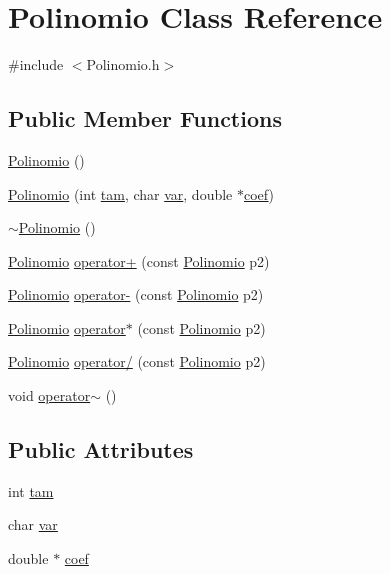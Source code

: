 \hypertarget{class_polinomio}{\section{Polinomio Class Reference}
\label{class_polinomio}
}


{\ttfamily \#include $<$Polinomio.\+h$>$}

\subsection*{Public Member Functions}
\begin{DoxyCompactItemize}
\item 
\hyperlink{class_polinomio_ac910fd7c555f384a2b12a8f498acd2f4}{Polinomio} ()
\item 
\hyperlink{class_polinomio_a7c1211aa14031169f101ac9feb3f7e29}{Polinomio} (int \hyperlink{class_polinomio_a4e1570a5d708ee593dd835fd886762f4}{tam}, char \hyperlink{class_polinomio_ac2471ef9aad80fb06f9ab99086d04af4}{var}, double $\ast$\hyperlink{class_polinomio_a14c45ccfc7450fb0fed2e5e6f45afb54}{coef})
\item 
\hyperlink{class_polinomio_a1023ada36c95fce6698316a632fdcc1c}{$\sim$\+Polinomio} ()
\item 
\hyperlink{class_polinomio}{Polinomio} \hyperlink{class_polinomio_a833b3913b53c14b6e7f3e39c908e0c5c}{operator+} (const \hyperlink{class_polinomio}{Polinomio} p2)
\item 
\hyperlink{class_polinomio}{Polinomio} \hyperlink{class_polinomio_a8315f494b84098d0c99e97e5b1acb413}{operator-\/} (const \hyperlink{class_polinomio}{Polinomio} p2)
\item 
\hyperlink{class_polinomio}{Polinomio} \hyperlink{class_polinomio_ad51ca40076a0aab3945e7d7d78f95bc2}{operator$\ast$} (const \hyperlink{class_polinomio}{Polinomio} p2)
\item 
\hyperlink{class_polinomio}{Polinomio} \hyperlink{class_polinomio_a141bc34ae9d7fae564ef6cc56669b3fd}{operator/} (const \hyperlink{class_polinomio}{Polinomio} p2)
\item 
void \hyperlink{class_polinomio_a3433445a715a473c4dd433e1d1248406}{operator$\sim$} ()
\end{DoxyCompactItemize}
\subsection*{Public Attributes}
\begin{DoxyCompactItemize}
\item 
int \hyperlink{class_polinomio_a4e1570a5d708ee593dd835fd886762f4}{tam}
\item 
char \hyperlink{class_polinomio_ac2471ef9aad80fb06f9ab99086d04af4}{var}
\item 
double $\ast$ \hyperlink{class_polinomio_a14c45ccfc7450fb0fed2e5e6f45afb54}{coef}
\end{DoxyCompactItemize}


